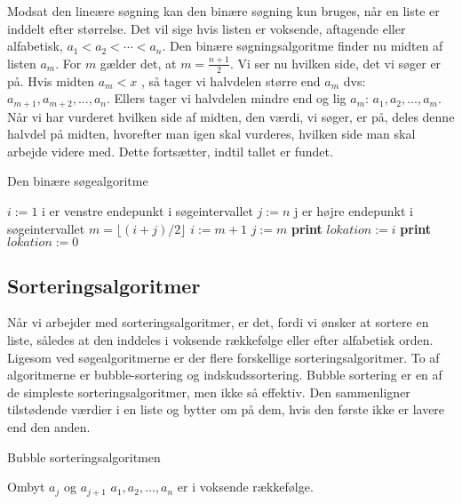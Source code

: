 Modsat den lineære søgning kan den binære søgning kun bruges, når en liste er inddelt efter størrelse. Det vil sige hvis listen er voksende, aftagende eller alfabetisk, $a_{1}<a_{2}<\dotsb<a_{n}$. Den binære søgningsalgoritme finder nu midten af listen $a_{m}$. For $m$ gælder det, at $m=\frac{n+1}{2}$. Vi ser nu hvilken side, det vi søger er på. Hvis midten $a_{m}<x$ , så tager vi halvdelen større end $a_{m}$ dvs: $a_{m+1}, a_{m+2},\dotsc,a_{n}$. Ellers tager vi halvdelen mindre end og lig $a_{m}$: $a_{1}, a_{2},\dotsc,a_{m}$. Når vi har vurderet hvilken side af midten, den værdi, vi søger, er på, deles denne halvdel på midten, hvorefter man igen skal vurderes, hvilken side man skal arbejde videre med. Dette fortsætter, indtil tallet er fundet. 

\begin{algorithm}[H]
\caption{Den binære søgealgoritme}
\begin{algorithmic}[1]

    \State $i:=1$ {i er venstre endepunkt i søgeintervallet}
    \State $j:=n$ {j er højre endepunkt i søgeintervallet}
        \State $m=\lfloor (i+j)/2 \rfloor$
    		\State $i:=m+1$
    		\Else
    		\State $j:=m$
    		\EndIf
    \State \textbf{print} $lokation:=i$
    \Else
    \State \textbf{print} $lokation:=0$
    \EndIf
    \EndWhile  \label{roy's loop}
\EndProcedure

\end{algorithmic}
\end{algorithm}

\subsection{Sorteringsalgoritmer}
Når vi arbejder med sorteringsalgoritmer, er det, fordi vi ønsker at sortere en liste, således at den inddeles i voksende rækkefølge eller efter alfabetisk orden. Ligesom ved søgealgoritmerne er der flere forskellige sorteringsalgoritmer. To af algoritmerne er bubble-sortering og indskudssortering. Bubble sortering er en af de simpleste sorteringsalgoritmer, men ikke så effektiv. Den sammenligner tilstødende værdier i en liste og bytter om på dem, hvis den første ikke er lavere end den anden.

\begin{algorithm}[H]
\caption{Bubble sorteringsalgoritmen}
\begin{algorithmic}[1]

\EndProcedure
{}
    			\State Ombyt $a_{j}$ og $a_{j+1}$ 	
\EndIf
\EndFor
\EndFor
\State $a_{1},a_{2},\dotsc,a_{n}$ er i voksende rækkefølge. 

\end{algorithmic}
\end{algorithm}

